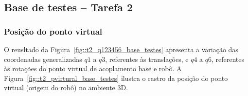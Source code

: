 \subsection{Base de testes -- Tarefa 2}

\subsubsection{Posição do ponto virtual}

O reusltado da Figura~\ref{fig::t2_q123456_base_testes} apresenta a variação das
coordenadas generalizadas $q1$ a $q3$, referentes às translações, e $q4$ a $q6$,
referentes às rotações do ponto virtual de acoplamento base e robô. A
Figura~\ref{fig::t2_pvirtural_base_testes} ilustra o rastro da posição do ponto
virtual (origem do robô) no ambiente 3D.


